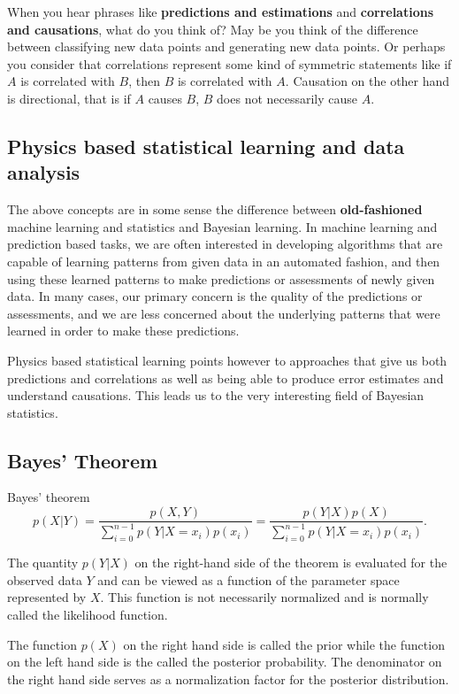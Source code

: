 \documentclass[%
oneside,                 %
final,                   %
10pt]{article}
\begin{document}
When you hear phrases like \textbf{predictions and estimations} and
\textbf{correlations and causations}, what do you think of?  May be you think
of the difference between classifying new data points and generating
new data points.
Or perhaps you consider that correlations represent some kind of symmetric statements like
if $A$ is correlated with $B$, then $B$ is correlated with
$A$. Causation on the other hand is directional, that is if $A$ causes $B$, $B$ does not
necessarily cause $A$.

\subsection{Physics based statistical learning and data analysis}

The above concepts are in some sense the difference between \textbf{old-fashioned} machine
learning and statistics and Bayesian learning. In machine learning and prediction based
tasks, we are often interested in developing algorithms that are
capable of learning patterns from given data in an automated fashion,
and then using these learned patterns to make predictions or
assessments of newly given data. In many cases, our primary concern
is the quality of the predictions or assessments, and we are less
concerned about the underlying patterns that were learned in order
to make these predictions.

Physics based statistical learning points however to approaches that give us both predictions and correlations as well as being able to produce error estimates and understand causations.  This leads us to the very interesting field of Bayesian statistics.

\subsection{Bayes' Theorem}

Bayes' theorem
\[
p(X\vert Y)= \frac{p(X,Y)}{\sum_{i=0}^{n-1}p(Y\vert X=x_i)p(x_i)}=\frac{p(Y\vert X)p(X)}{\sum_{i=0}^{n-1}p(Y\vert X=x_i)p(x_i)}.
\]

The quantity $p(Y\vert X)$ on the right-hand side of the theorem is
evaluated for the observed data $Y$ and can be viewed as a function of
the parameter space represented by $X$. This function is not
necessarily normalized and is normally called the likelihood function.

The function $p(X)$ on the right hand side is called the prior while the function on the left hand side is the called the posterior probability. The denominator on the right hand side serves as a normalization factor for the posterior distribution.
\end{document}
